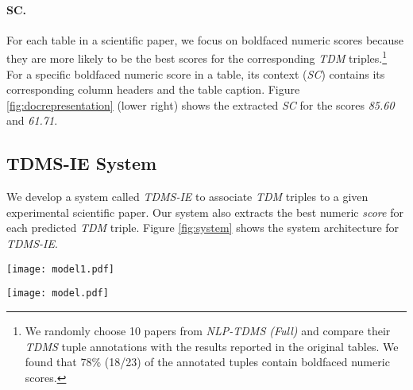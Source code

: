 \documentclass[11pt,a4paper]{article}
\begin{document}
\paragraph{SC.} For each table in a scientific paper, we focus on boldfaced numeric scores because they are more likely to be the best scores for the corresponding \emph{TDM} triples.\footnote{We randomly choose 10 papers from \emph{NLP-TDMS (Full)} and compare their \emph{TDMS} tuple annotations with the results reported in the original tables.  We found that 78\% (18/23) of the annotated tuples contain boldfaced numeric scores.} For a specific boldfaced numeric score in a table, its context (\emph{SC}) contains its corresponding column headers and the table caption. Figure \ref{fig:docrepresentation} (lower right) shows the extracted \emph{SC} for the scores \emph{85.60} and \emph{61.71}.



\subsection{TDMS-IE System}
\label{sec:tdms-ie}
We develop a system called \emph{TDMS-IE} to associate \emph{TDM} triples to a given experimental scientific paper. Our system also extracts the best numeric \textit{score} for each predicted \emph{TDM} triple. Figure \ref{fig:system} shows the system architecture for \emph{TDMS-IE}. 

\begin{figure*}[t]
\begin{center}
\texttt{[image: model1.pdf]}
\end{center}
\caption{Examples of document representation (\emph{DocTAET}) and score context (\emph{SC}) representation.}
\label{fig:docrepresentation}
\end{figure*}

\begin{figure*}[t]
\begin{center}
\texttt{[image: model.pdf]}
\end{center}
\caption{System architecture for \emph{TDMS-IE}.}
\label{fig:system}
\end{figure*}
\end{document}
